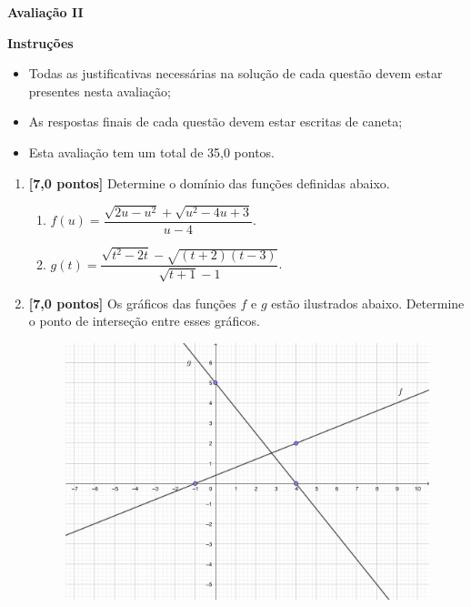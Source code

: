 \documentclass[12pt,a4paper]{article}
\begin{document}
\begin{center}
 \textbf{Avaliação II}
\end{center}

\textbf{Instruções}
\begin{itemize}
 \item Todas as justificativas necessárias na solução de cada questão devem estar presentes nesta avaliação;
 \item As respostas finais de cada questão devem estar escritas de caneta;
 \item Esta avaliação tem um total de 35,0 pontos.
\end{itemize}

\begin{enumerate}
  \item \textbf{[7,0 pontos]} Determine o domínio das funções definidas abaixo.
  \begin{enumerate}
    \item $f(u) = \dfrac{\sqrt{2u - u^2} + \sqrt{u^2 - 4u + 3}}{u - 4}$.
    \item $g(t) = \dfrac{\sqrt{t^2 - 2t} - \sqrt{(t + 2)(t - 3)}}{\sqrt{t + 1} - 1}$.
  \end{enumerate}
  
  \item \textbf{[7,0 pontos]} Os gráficos das funções $f$ e $g$ estão ilustrados abaixo. Determine o ponto de interseção entre esses gráficos.
  
    \begin{figure}[H]
     \centering
     \includegraphics[scale=0.5]{figura/grafico-avaliacao-ii-20-1.png}
    \end{figure}
  

\end{enumerate}
\end{document}
